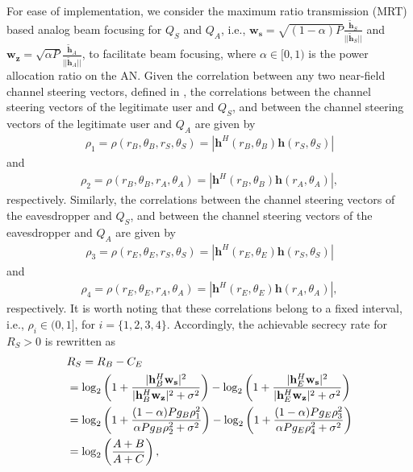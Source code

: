 \documentclass[10pt,technote]{IEEEtran}
\newcommand{\1}{\mathbbm{1}}
\begin{document}
For ease of implementation, we consider the maximum ratio transmission (MRT) based analog beam focusing for $Q_S$ and $Q_A$, %
i.e., $\mathbf{w_s} = \sqrt{(1-\alpha)P}\frac{\tilde{\mathbf{h}}_S}{||\tilde{\mathbf{h}}_S||}$ and $\mathbf{w_z} = \sqrt{\alpha P}\frac{\tilde{\mathbf{h}}_A}{||\tilde{\mathbf{h}}_A||}$, to facilitate beam focusing, where $\alpha\in[0,1)$ is the power allocation ratio on the AN. Given the correlation between any two near-field channel steering vectors, defined in \cite[\textbf{Definition 1}]{zhang2024performanceanalysislowcomplexitybeamforming}, the correlations between the channel steering vectors of the legitimate user and $Q_S$, and between the channel steering vectors of the legitimate user and $Q_A$ are given by
\begin{align}
\rho_1 = \rho(r_B,\theta_B,r_S,\theta_S) = |\mathbf{h}^H(r_B,\theta_B)\mathbf{h}(r_S,\theta_S)|
\end{align}
and
\begin{align}
\rho_2 = \rho(r_B,\theta_B,r_A,\theta_A) = |\mathbf{h}^H(r_B,\theta_B)\mathbf{h}(r_A,\theta_A)|,
\end{align}
respectively. Similarly, the correlations between the channel steering vectors of the eavesdropper and $Q_S$, and between the channel steering vectors of the eavesdropper and $Q_A$ are given by
\begin{align}
\rho_3 = \rho(r_E,\theta_E,r_S,\theta_S) = |\mathbf{h}^H(r_E,\theta_E)\mathbf{h}(r_S,\theta_S)|
\end{align}
and
\begin{align}
\rho_4 = \rho(r_E,\theta_E,r_A,\theta_A) = |\mathbf{h}^H(r_E,\theta_E)\mathbf{h}(r_A,\theta_A)|,
\end{align}
respectively. It is worth noting that these correlations belong to a fixed interval, i.e., $\rho_i\in(0,1]$, for $i=\{1,2,3,4\}$. Accordingly, the achievable secrecy rate for $R_S>0$ is rewritten as
\begin{align}
&R_S = R_B-C_E\notag\\
&=\log_2\left(1+\frac{|\mathbf{h}_{B}^{H} \mathbf{w_s}|^2}{|\mathbf{h}_{B}^{H}\mathbf{w_z}|^2+\sigma^2}\right) - \log_2\left(1+\frac{|\mathbf{h}_{E}^{H} \mathbf{w_s}|^2}{|\mathbf{h}_{E}^{H}\mathbf{w_z}|^2+\sigma^2}\right)\notag\\
&=\log_2\left(1+\frac{(1-\alpha)P g_B\rho_1^2}{\alpha P g_B \rho_2^2+\sigma^2}\right)-\log_2\left(1+\frac{(1-\alpha)P g_E\rho_3^2}{\alpha P g_E \rho_4^2+\sigma^2}\right)\notag\\
& = \log_2\left(\frac{A+B}{A+C}\right),
\end{align}
\end{document}
